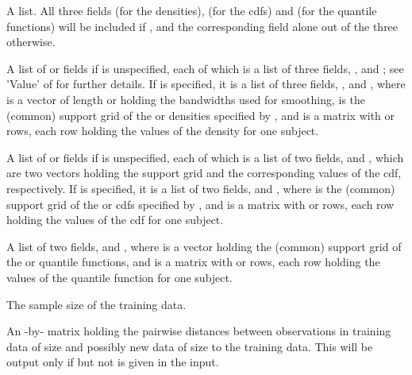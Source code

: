\documentclass[a4paper]{book}
\begin{document}
\begin{Value}
A list. All three fields  (for the densities),  (for the cdfs) 
and  (for the quantile functions) will be included if , 
and the corresponding field alone out of the three otherwise.
\begin{ldescription}
\item[\code{den}] A list of  or  fields if  is unspecified, 
each of which is a list of three fields, ,  and ; 
see 'Value' of  for further details.
If  is specified, 
it is a list of three fields, ,  and , where 
 is a vector of length  or  holding the bandwidths used for smoothing,
 is the (common) support grid of the  or  densities specified by , 
and  is a matrix with  or  rows, each row holding the values of the density for one subject.
\item[\code{cdf}] A list of  or  fields if  is unspecified, 
each of which is a list of two fields,  and , 
which are two vectors holding the support grid and the corresponding values of the cdf, respectively.
If  is specified, 
it is a list of two fields,  and , where 
 is the (common) support grid of the  or  cdfs specified by , 
and  is a matrix with  or  rows, each row holding the values of the cdf for one subject.
\item[\code{qf}] A list of two fields,  and , where 
 is a vector holding the (common) support grid of the  or  quantile functions, 
and  is a matrix with  or  rows, each row holding the values of the quantile function for one subject.
\item[\code{n}] The sample size of the training data.
\item[\code{distmat}] An -by- matrix holding the pairwise distances between observations 
in training data of size  and possibly new data of size  to the training data. 
This will be output only if  but not  is given in the input.
\end{ldescription}
\end{Value}
\end{document}

